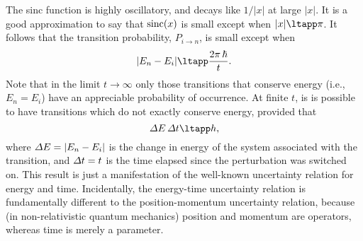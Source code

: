 The sinc function is highly oscillatory, and decays like $1/|x|$ 
at large $|x|$. It is a good approximation to say that ${\rm sinc}(x)$ 
is small except when $|x| \ltapp \pi$. It follows that the
transition probability, $P_{i\rightarrow n}$,  is small except when
\begin{equation}
|E_n - E_i| \ltapp \frac{2\pi\, \hbar}{t}.
\end{equation}
Note that in the limit $t\rightarrow \infty$ only those transitions
that conserve energy ({\rm i.e.}, $E_n=E_i$) have  an appreciable
probability of occurrence. At finite $t$, is is possible to
have transitions which do not exactly conserve energy, provided that
\begin{equation}
{\mit\Delta} E \,{\mit\Delta} t \ltapp h,
\end{equation}
where ${\mit\Delta} E = |E_n - E_i|$ is the change in energy of the system associated
with the transition, and ${\mit\Delta} t = t$ is the time elapsed since the
perturbation was switched on. This result is just a manifestation
of the well-known uncertainty relation for energy and time. Incidentally, the energy-time 
uncertainty relation is fundamentally different to the position-momentum
uncertainty relation, because  (in non-relativistic quantum mechanics)
position and momentum are operators, whereas time is merely a parameter. 

